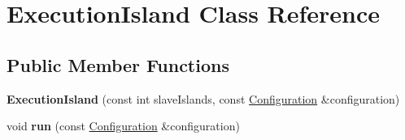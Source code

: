\hypertarget{classExecutionIsland}{}\section{Execution\+Island Class Reference}
\label{classExecutionIsland}
\subsection*{Public Member Functions}
\begin{DoxyCompactItemize}
\item 
\mbox{\label{classExecutionIsland_a050d1773ab51dc5301e19c06f87d7a53}} 
{\bfseries Execution\+Island} (const int slave\+Islands, const \mbox{\hyperlink{classConfiguration}{Configuration}} \&configuration)
\item 
\mbox{\label{classExecutionIsland_af6731fdb9aa6e8d2df9657f248a67b90}} 
void {\bfseries run} (const \mbox{\hyperlink{classConfiguration}{Configuration}} \&configuration)
\end{DoxyCompactItemize}
